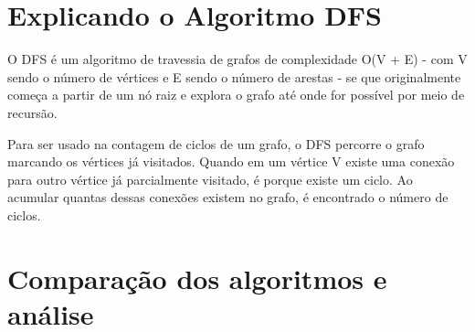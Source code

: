 \documentclass[12pt]{article}
\begin{document}
\section{Explicando o Algoritmo DFS}
O DFS é um algoritmo de travessia de grafos de complexidade O(V + E) - com V sendo o número de 
vértices e E sendo o número de arestas - se que originalmente começa a partir de um nó raiz e 
explora o grafo até onde for possível por meio de recursão.

Para ser usado na contagem de ciclos de um grafo, o DFS percorre o grafo marcando os vértices 
já visitados. Quando em um vértice V existe uma conexão para outro vértice já parcialmente
visitado, é porque existe um ciclo. Ao acumular quantas dessas conexões existem no grafo,
é encontrado o número de ciclos.\vspace{10pt}

\section{Comparação dos algoritmos e análise}
\end{document}
